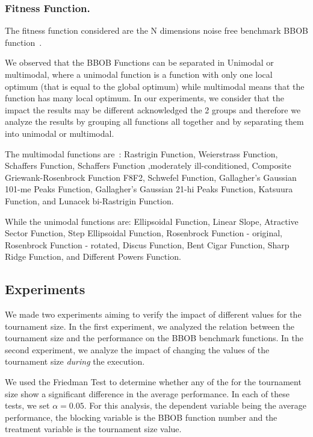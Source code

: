 \subsubsection*{Fitness Function.}
The fitness function considered are the N dimensions noise free benchmark BBOB function~\cite{hansen2010real}.


We observed that the BBOB Functions can be separated in Unimodal or multimodal, where a unimodal function is a function with only one local optimum (that is equal to the global optimum) while multimodal means that the function has many local optimum. In our experiments, we consider that the impact the results may be different acknowledged the 2 groups and therefore we analyze the results by grouping all functions all together and by separating them into unimodal or multimodal. 

The multimodal functions are~\cite{hansen2010real}: Rastrigin Function, Weierstrass Function, Schaffers Function, Schaffers Function ,moderately ill-conditioned, Composite Griewank-Rosenbrock Function F8F2, Schwefel Function, Gallagher's Gaussian 101-me Peaks Function, Gallagher's Gaussian 21-hi Peaks Function, Katsuura Function, and Lunacek bi-Rastrigin Function.

While the unimodal functions are: Ellipsoidal Function, Linear Slope, Atractive Sector Function,  Step Ellipsoidal Function, Rosenbrock Function - original, Rosenbrock Function - rotated, Discus Function, Bent Cigar Function, Sharp Ridge Function, and Different Powers Function.

\label{sec:experiment}

\subsection{Experiments}
We made two experiments aiming to verify the impact of different values for the tournament size. In the first experiment, we analyzed the relation between the tournament size and the performance on the BBOB benchmark functions. In the second experiment, we analyze the impact of changing the values of the tournament size \textit{during} the execution.

We used the Friedman Test to determine whether any of the for the tournament size show a significant difference in the average performance. In each of these tests, we set $\alpha = 0.05$. For this analysis, the dependent variable being the average performance, the blocking variable is the BBOB function number and the treatment variable is the tournament size value.

